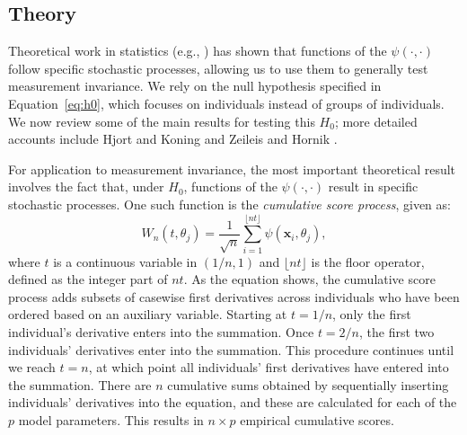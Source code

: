 \documentclass[man]{apa}
\begin{document}
\subsection{Theory}
Theoretical work in statistics (e.g.,
) has shown 
that functions of the 
$\psi(\cdot, \cdot)$ follow specific stochastic processes, allowing
us to use them to generally test measurement
invariance.  
We rely on the null hypothesis specified in Equation~\eqref{eq:h0},
which focuses on individuals instead of groups of individuals.
We now review some of the main results
for testing this $H_0$; more
detailed accounts include Hjort and Koning \citeyear{HjoKon02} and
Zeileis and Hornik \citeyear{ZeiHor07}.


For application to measurement invariance, the most important
theoretical result involves the fact that, under $H_0$, functions of
the $\psi(\cdot, \cdot)$ result in specific stochastic
processes.  One such function
is the {\em{cumulative score process}}, given as:
\begin{equation}
    \label{eq:cumscore}
    W_n(t,\theta_j) = \frac{1}{\sqrt{n}} \sum_{i=1}^{\lfloor nt
      \rfloor} \psi ({\bm{x}}_i, \theta_j),
\end{equation}
where $t$ is a continuous variable in $(1/n,1)$ and $\lfloor nt
\rfloor$ is the floor operator, defined as the integer part of
$nt$.
As the equation shows, the cumulative score process adds subsets of
casewise first derivatives across individuals who have been ordered
based on an auxiliary variable.  Starting at $t=1/n$, only the
first individual's derivative enters into the summation.  Once
$t=2/n$, the first two individuals' derivatives enter into the
summation.  This procedure continues until we reach $t=n$, at which
point all individuals' first derivatives have entered into the
summation.  There are $n$ cumulative sums obtained by sequentially
inserting individuals' derivatives into the equation, and these are
calculated 
for each of the $p$ model parameters.  This results
in $n\times p$
empirical cumulative scores.
\end{document}
